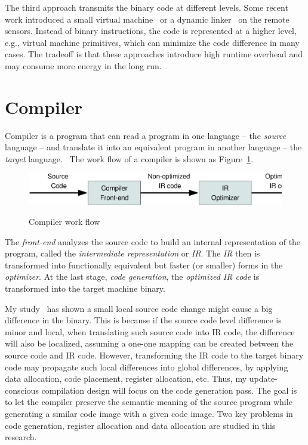 The third approach transmits the binary code at different levels.  Some recent work introduced a small virtual machine~\cite{mate} or a dynamic linker~\cite{related:dynamic2,related:dynamic1} on the remote sensors. Instead of binary instructions, the code is represented at a higher level, e.g., virtual machine primitives,
which can minimize the code difference in many cases. The tradeoff is that these approaches introduce high runtime overhead and may consume more energy in the long run.


\section{Compiler}

Compiler is a program that can read a program in one language -- the \textit{source} language -- and translate it into an equivalent program in another language -- the \textit{target} language.~\cite{compiler}
The work flow of a compiler is shown as Figure~\ref{fig:compiler}.

\begin{figure}[htbp]
	\centering
		\includegraphics[scale=0.45]{figures/compiler.eps}
	\label{fig:compiler}
	\caption{Compiler work flow}
\end{figure}

The \textit{front-end} analyzes the source code to build an internal representation of the program, called the \textit{intermediate representation} or \textit{IR}. The \textit{IR} then is transformed into functionally equivalent but faster (or smaller) forms in the \textit{optimizer}. At the last stage, \textit{code generation}, the \textit{optimized IR code} is transformed into the target machine binary.

My study~\cite{ucc} has shown a small local source code change might cause a big difference in the binary. This is because if the source code level difference is minor and local, when translating such source code into IR code, the difference will also be localized, assuming a one-one mapping can be created between the source code and IR code. However, transforming the IR code to the target binary code may propagate such local differences into global differences, by applying data allocation, code placement, register allocation, etc. Thus, my update-conscious compilation design will focus on the code generation pass. The goal is to let the compiler preserve the semantic meaning of the source program while generating a similar code image with a given code image. Two key problems in code generation, register allocation and data allocation are studied in this research.

